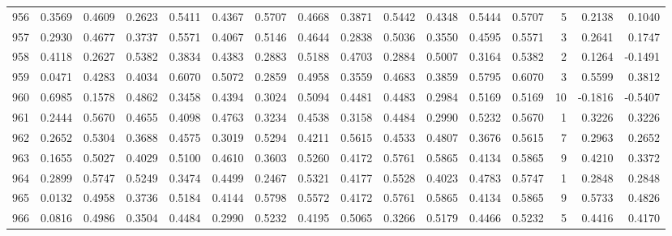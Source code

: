 \begin{tabular}{lrrrrrrrrrrrrrrr}
956 &      0.3569 &  0.4609 &  0.2623 &  0.5411 &  0.4367 &  0.5707 &  0.4668 &  0.3871 &  0.5442 &  0.4348 &   0.5444 &     0.5707 &      5 &                    0.2138 &                     0.1040 \\
957 &      0.2930 &  0.4677 &  0.3737 &  0.5571 &  0.4067 &  0.5146 &  0.4644 &  0.2838 &  0.5036 &  0.3550 &   0.4595 &     0.5571 &      3 &                    0.2641 &                     0.1747 \\
958 &      0.4118 &  0.2627 &  0.5382 &  0.3834 &  0.4383 &  0.2883 &  0.5188 &  0.4703 &  0.2884 &  0.5007 &   0.3164 &     0.5382 &      2 &                    0.1264 &                    -0.1491 \\
959 &      0.0471 &  0.4283 &  0.4034 &  0.6070 &  0.5072 &  0.2859 &  0.4958 &  0.3559 &  0.4683 &  0.3859 &   0.5795 &     0.6070 &      3 &                    0.5599 &                     0.3812 \\
960 &      0.6985 &  0.1578 &  0.4862 &  0.3458 &  0.4394 &  0.3024 &  0.5094 &  0.4481 &  0.4483 &  0.2984 &   0.5169 &     0.5169 &     10 &                   -0.1816 &                    -0.5407 \\
961 &      0.2444 &  0.5670 &  0.4655 &  0.4098 &  0.4763 &  0.3234 &  0.4538 &  0.3158 &  0.4484 &  0.2990 &   0.5232 &     0.5670 &      1 &                    0.3226 &                     0.3226 \\
962 &      0.2652 &  0.5304 &  0.3688 &  0.4575 &  0.3019 &  0.5294 &  0.4211 &  0.5615 &  0.4533 &  0.4807 &   0.3676 &     0.5615 &      7 &                    0.2963 &                     0.2652 \\
963 &      0.1655 &  0.5027 &  0.4029 &  0.5100 &  0.4610 &  0.3603 &  0.5260 &  0.4172 &  0.5761 &  0.5865 &   0.4134 &     0.5865 &      9 &                    0.4210 &                     0.3372 \\
964 &      0.2899 &  0.5747 &  0.5249 &  0.3474 &  0.4499 &  0.2467 &  0.5321 &  0.4177 &  0.5528 &  0.4023 &   0.4783 &     0.5747 &      1 &                    0.2848 &                     0.2848 \\
965 &      0.0132 &  0.4958 &  0.3736 &  0.5184 &  0.4144 &  0.5798 &  0.5572 &  0.4172 &  0.5761 &  0.5865 &   0.4134 &     0.5865 &      9 &                    0.5733 &                     0.4826 \\
966 &      0.0816 &  0.4986 &  0.3504 &  0.4484 &  0.2990 &  0.5232 &  0.4195 &  0.5065 &  0.3266 &  0.5179 &   0.4466 &     0.5232 &      5 &                    0.4416 &                     0.4170 \\

\end{tabular}
